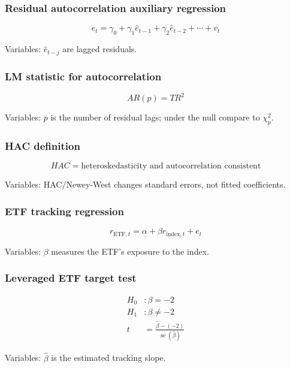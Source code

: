 \documentclass[
  8pt,
  twocolumn]{extarticle}
\begin{document}
\subsubsection{Residual autocorrelation auxiliary
regression}\label{residual-autocorrelation-auxiliary-regression}

\[
\hat e_t=\gamma_0+\gamma_1\hat e_{t-1}+\gamma_2\hat e_{t-2}+\cdots+v_t
\]

Variables: \(\hat e_{t-j}\) are lagged residuals.

\subsubsection{LM statistic for
autocorrelation}\label{lm-statistic-for-autocorrelation}

\[
AR(p)=TR^2
\]

Variables: \(p\) is the number of residual lags; under the null compare
to \(\chi_p^2\).

\subsubsection{HAC definition}\label{hac-definition}

\[
HAC=\text{heteroskedasticity and autocorrelation consistent}
\]

Variables: HAC/Newey-West changes standard errors, not fitted
coefficients.

\subsubsection{ETF tracking regression}\label{etf-tracking-regression}

\[
r_{\text{ETF},t}=\alpha+\beta r_{\text{index},t}+e_t
\]

Variables: \(\beta\) measures the ETF's exposure to the index.

\subsubsection{Leveraged ETF target
test}\label{leveraged-etf-target-test}

\[
\begin{aligned}
H_0&:\beta=-2\\
H_1&:\beta\ne-2\\
t&=\frac{\hat\beta-(-2)}{\operatorname{se}(\hat\beta)}
\end{aligned}
\]

Variables: \(\hat\beta\) is the estimated tracking slope.
\end{document}

